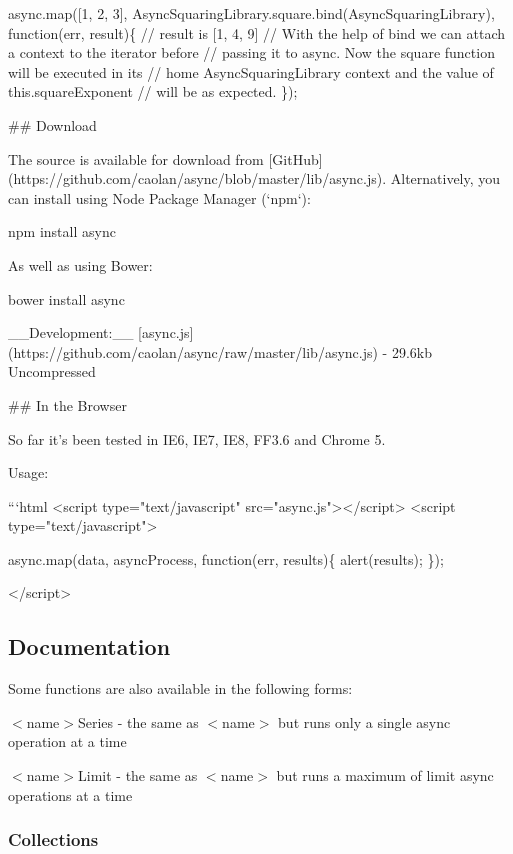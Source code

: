 async.\+map(\mbox{[}1, 2, 3\mbox{]}, Async\+Squaring\+Library.\+square.\+bind(\+Async\+Squaring\+Library), function(err, result)\{ // result is \mbox{[}1, 4, 9\mbox{]} // With the help of bind we can attach a context to the iterator before // passing it to async. Now the square function will be executed in its // \textquotesingle{}home\textquotesingle{} Async\+Squaring\+Library context and the value of {\ttfamily this.\+square\+Exponent} // will be as expected. \}); 
\begin{DoxyCode}
## Download

The source is available for download from
[GitHub](https://github.com/caolan/async/blob/master/lib/async.js).
Alternatively, you can install using Node Package Manager (`npm`):

    npm install async

As well as using Bower:

    bower install async

\_\_Development:\_\_ [async.js](https://github.com/caolan/async/raw/master/lib/async.js) - 29.6kb Uncompressed

## In the Browser

So far it's been tested in IE6, IE7, IE8, FF3.6 and Chrome 5.

Usage:

```html
<script type="text/javascript" src="async.js"></script>
<script type="text/javascript">

    async.map(data, asyncProcess, function(err, results)\{
        alert(results);
    \});

</script>
\end{DoxyCode}


\subsection*{Documentation}

Some functions are also available in the following forms\+:
\begin{DoxyItemize}
\item {\ttfamily $<$name$>$Series} -\/ the same as {\ttfamily $<$name$>$} but runs only a single async operation at a time
\item {\ttfamily $<$name$>$Limit} -\/ the same as {\ttfamily $<$name$>$} but runs a maximum of {\ttfamily limit} async operations at a time
\end{DoxyItemize}

\subsubsection*{Collections}



